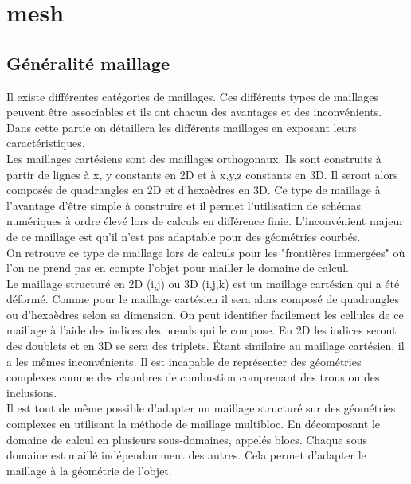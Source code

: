 \section{mesh}

\subsection{Généralité maillage}

Il existe différentes catégories de maillages. Ces différents types de maillages peuvent être associables et ils ont chacun des avantages et des inconvénients. Dans cette partie on détaillera les différents maillages en exposant leurs caractéristiques.\\

Les maillages cartésiens sont des maillages orthogonaux. Ils sont construits à partir de lignes à x, y constants en 2D et à x,y,z constants en 3D. Il seront alors composés de quadrangles en 2D et d'hexaèdres en 3D. Ce type de maillage à l'avantage d'être simple à construire et il permet l'utilisation de schémas numériques à ordre élevé lors de calculs en différence finie. L'inconvénient majeur de ce maillage est qu'il n'est pas adaptable pour des géométries courbés.\\
On retrouve ce type de maillage lors de calculs pour les "frontières immergées" où l'on ne prend pas en compte l'objet pour mailler le domaine de calcul.\\

Le maillage structuré en 2D (i,j) ou 3D (i,j,k) est un maillage cartésien qui a été déformé. Comme pour le maillage cartésien il sera alors composé de quadrangles ou d'hexaèdres selon sa dimension. On peut identifier facilement les cellules de ce maillage à l'aide des indices des nœuds qui le compose. En 2D les indices seront des doublets et en 3D se sera des triplets.
Étant similaire au maillage cartésien, il a les mêmes inconvénients. Il est incapable de représenter des géométries complexes comme des chambres de combustion comprenant des trous ou des inclusions.\\
Il est tout de même possible d'adapter un maillage structuré sur des géométries complexes en utilisant la méthode de maillage multibloc. En décomposant le domaine de calcul en plusieurs sous-domaines, appelés blocs. Chaque sous domaine est maillé indépendamment des autres. Cela permet d'adapter le maillage à la géométrie de l'objet.\\


